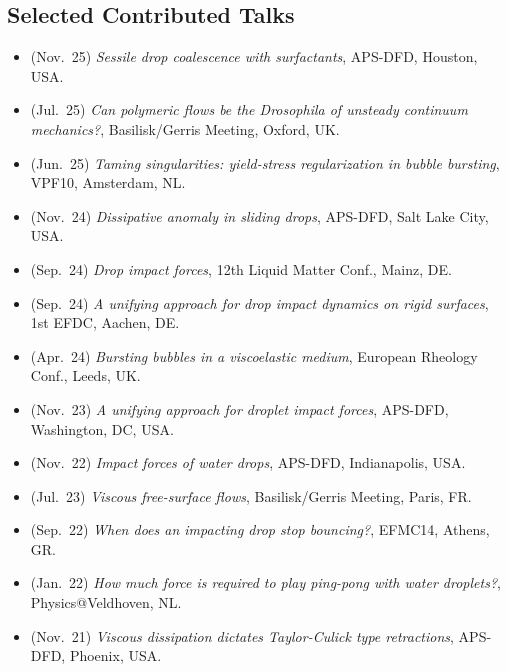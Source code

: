 \subsection{\faComments\hspace{0.3em}Selected Contributed Talks}
\begin{itemize}[leftmargin=1.5em]
\item[\textbullet] (Nov.~25) \emph{Sessile drop coalescence with surfactants}, APS-DFD, Houston, USA.
\item[\textbullet] (Jul.~25) \emph{Can polymeric flows be the Drosophila of unsteady continuum mechanics?}, Basilisk/Gerris Meeting, Oxford, UK.
\item[\textbullet] (Jun.~25) \emph{Taming singularities: yield-stress regularization in bubble bursting}, VPF10, Amsterdam, NL.
\item[\textbullet] (Nov.~24) \emph{Dissipative anomaly in sliding drops}, APS-DFD, Salt Lake City, USA.
\item[\textbullet] (Sep.~24) \emph{Drop impact forces}, 12th Liquid Matter Conf., Mainz, DE.
\item[\textbullet] (Sep.~24) \emph{A unifying approach for drop impact dynamics on rigid surfaces}, 1st EFDC, Aachen, DE.
\item[\textbullet] (Apr.~24) \emph{Bursting bubbles in a viscoelastic medium}, European Rheology Conf., Leeds, UK.
\item[\textbullet] (Nov.~23) \emph{A unifying approach for droplet impact forces}, APS-DFD, Washington, DC, USA. \href{https://youtu.be/3S_hwkMCx6U?si=01tvC4RHCoga62bC}{\color{red}\faYoutube}
\item[\textbullet] (Nov.~22) \emph{Impact forces of water drops}, APS-DFD, Indianapolis, USA. \href{https://youtu.be/U0g67zV70hw}{\color{red}\faYoutube}
\item[\textbullet] (Jul.~23) \emph{Viscous free-surface flows}, Basilisk/Gerris Meeting, Paris, FR.
\item[\textbullet] (Sep.~22) \emph{When does an impacting drop stop bouncing?}, EFMC14, Athens, GR.
\item[\textbullet] (Jan.~22) \emph{How much force is required to play ping-pong with water droplets?}, Physics@Veldhoven, NL. \href{https://youtu.be/wmEYeQRPi0Q?si=u8Ex64dYLHQ8TxCE}{\color{red}\faYoutube}
\item[\textbullet] (Nov.~21) \emph{Viscous dissipation dictates Taylor-Culick type retractions}, APS-DFD, Phoenix, USA. \href{https://youtu.be/d0tMlpbMIqY?si=V-7Lh5g-zj1j7al6}{\color{red}\faYoutube}

\end{itemize}

